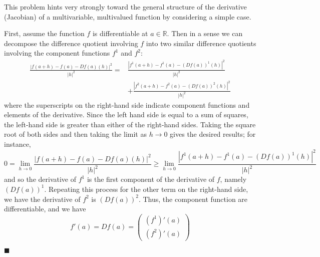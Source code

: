 \documentclass[12pt]{article}
\renewcommand{\qed}{\hfill$\blacksquare$}
\renewenvironment{proof}{\begin{addmargin}[1em]{0em}\begin{newproof}}{\end{newproof}\end{addmargin}\qed}
\begin{document}
\begin{proof}
This problem hints very strongly toward the general structure of the derivative (Jacobian) of a multivariable, multivalued function by considering a simple case. 

First, assume the function $f$ is differentiable at $a\in\mathbb{R}$. Then in a sense we can decompose the difference quotient involving $f$ into two similar difference quotients involving the component functions $f^1$ and $f^2$:
\begin{equation*}\begin{split}
\frac{\left| f\left(a+h\right)  - f\left(a\right) - Df\left(a\right)\left(h\right)\right|^2}{\left| h\right|^2} =  & \frac{\left| f^1\left(a+h\right) - f^1\left(a\right) - \left(Df\left(a\right)\right)^1\left(h\right)\right|^2}{\left| h\right|^2}  \\ & + \frac{\left| f^2\left(a+h\right) - f^2\left(a\right) - \left(Df\left(a\right)\right)^2\left(h\right)\right|^2}{\left| h\right|^2}
\end{split}\end{equation*}
where the superscripts on the right-hand side indicate component functions and elements of the derivative. Since the left hand side is equal to a sum of squares, the left-hand side is greater than either of the right-hand sides. Taking the square root of both sides and then taking the limit as $h\rightarrow 0$ gives the desired results; for instance,
$$ 0 = \lim_{h\rightarrow 0} \frac{\left| f\left(a+h\right)  - f\left(a\right) - Df\left(a\right)\left(h\right)\right|^2}{\left| h\right|^2} \geq \lim_{h\rightarrow 0} \frac{\left| f^1\left(a+h\right) - f^1\left(a\right) - \left(Df\left(a\right)\right)^1\left(h\right)\right|^2}{\left| h\right|^2}  $$ and so the derivative of $f^1$ is the first component of the derivative of $f$, namely $\left(Df\left(a\right)\right)^1$. Repeating this process for the other term on the right-hand side, we have the derivative of $f^2$ is $\left(Df\left(a\right)\right)^2$. Thus, the component function are differentiable, and we have 
$$ f'\left(a\right) = Df\left(a\right) = \left( \begin{array}{c} \left(f^1\right)'\left(a\right) \\ \left(f^2\right)'\left(a\right) \end{array}\right) $$


\end{proof}
\end{document}
